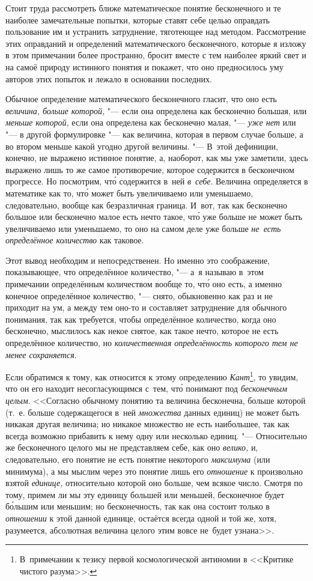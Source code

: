 Стоит труда рассмотреть ближе математическое понятие бесконечного и те наиболее
замечательные попытки, которые ставят себе целью оправдать пользование им
и устранить затруднение, тяготеющее над методом. Рассмотрение этих оправданий
и определений математического бесконечного, которые я изложу в этом примечании
более пространно, бросит вместе с тем наиболее яркий свет и на самоё природу
истинного понятия и покажет, что оно предносилось уму авторов этих попыток
и лежало в основании последних.

Обычное определение математического бесконечного гласит, что оно есть
{\em величина, больше которой,} "--- если она определена как бесконечно
большая, или {\em меньше которой,} если она определена как бесконечно малая,
"--- {\em уже нет} или "--- в другой формулировке "--- как величина, которая
в первом случае больше, а во втором меньше какой угодно другой величины. "---
В~этой дефиниции, конечно, не выражено истинное понятие, а, наоборот, как мы
уже заметили, здесь выражено лишь то же самое противоречие, которое содержится
в бесконечном прогрессе. Но посмотрим, чт\'{о} содержится в~ней
{\em в~себе}. Величина определяется в математике как то, чт\'{о} может быть
увеличиваемо или уменьшаемо, следовательно, вообще как безразличная граница.
И~вот, так как бесконечно большое или бесконечно малое есть нечто такое, чт\'{о}
уже больше не может быть увеличиваемо или уменьшаемо, то оно на самом деле уже
больше {\em не~есть определённое количество} как таковое.

Этот вывод необходим и непосредственен. Но именно это соображение,
показывающее, что определённое количество, "--- а~я называю в~этом примечании
определённым количеством вообще то, чт\'{о} оно есть, а именно конечное определённое количество,
"--- снято, обыкновенно как раз и не приходит на ум, а между тем оно-то
и составляет затруднение для обычного понимания, так как требуется, чтобы
определённое количество, когда оно бесконечно, мыслилось как некое снятое,
как такое нечто, которое не есть определённое количество, но
{\em количественная определённость которого тем не менее сохраняется}.

Если обратимся к тому, как относится к этому определению
{\em Кант}\footnote{В~примечании к тезису первой космологической антиномии
в <<Критике чистого разума>>.}, то увидим, что он его находит несогласующимся
с~тем, чт\'{о} понимают под {\em бесконечным целым}. <<Согласно обычному
понятию та величина бесконечна, больше которой (т.~е. больше содержащегося
в~ней {\em множества} данных единиц) не может быть никакая другая величина; но
никакое множество не есть наибольшее, так как всегда возможно прибавить к нему
одну или несколько единиц. "--- Относительно же бесконечного целого мы не
представляем себе, как оно {\em велико,} и, следовательно, его понятие не есть
понятие некоторого {\em максимума} (или минимума), а мы мыслим через это
понятие лишь его {\em отношение} к произвольно взятой {\em единице,}
относительно которой оно больше, чем всякое число. Смотря по тому, примем ли
мы эту единицу большей или меньшей, бесконечное будет б\'{о}льшим или меньшим; но
бесконечность, так как она состоит только в {\em отношении} к этой данной
единице, остаётся всегда одной и той же, хотя, разумеется, абсолютная величина
целого этим вовсе не~будет узнана>>.

